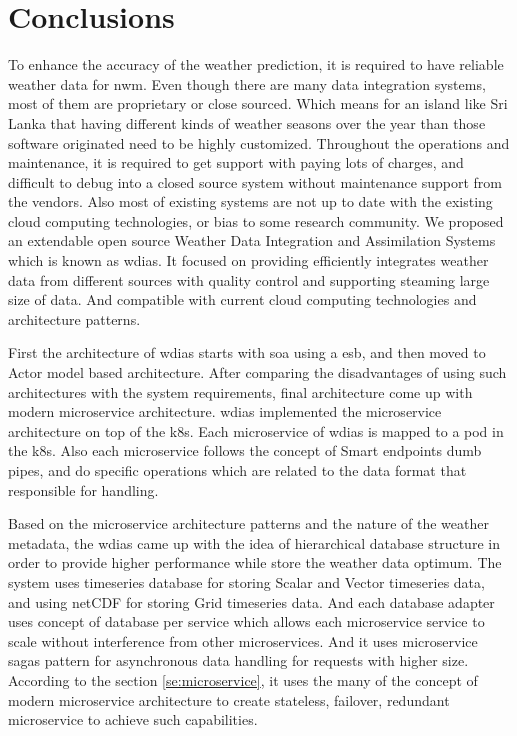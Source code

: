 \section{Conclusions}
\label{se:summary_conclusion}

To enhance the accuracy of the weather prediction, it is required to have reliable weather data for \acrshort{nwm}. Even though there are many data integration systems, most of them are proprietary or close sourced. Which means for an island like Sri Lanka that having different kinds of weather seasons over the year than those software originated need to be highly customized. Throughout the operations and maintenance, it is required to get support with paying lots of charges, and difficult to debug into a closed source system without maintenance support from the vendors. Also most of existing systems are not up to date with the existing cloud computing technologies, or bias to some research community.
We proposed an extendable open source Weather Data Integration and Assimilation Systems which is known as \acrshort{wdias}. It focused on providing efficiently integrates weather data from different sources with quality control and supporting steaming large size of data. And compatible with current cloud computing technologies and architecture patterns.

First the architecture of \acrshort{wdias} starts with \acrshort{soa} using a \acrfull{esb}, and then moved to Actor model based architecture. After comparing the disadvantages of using such architectures with the system requirements, final architecture come up with modern microservice architecture.
\acrshort{wdias} implemented the microservice architecture on top of the \acrshort{k8s}. Each microservice of \acrshort{wdias} is mapped to a pod in the \acrshort{k8s}. Also each microservice follows the concept of Smart endpoints dumb pipes, and do specific operations which are related to the data format that responsible for handling.

Based on the microservice architecture patterns and the nature of the weather metadata, the \acrshort{wdias} came up with the idea of hierarchical database structure in order to provide higher performance while store the weather data optimum. The system uses timeseries database for storing Scalar and Vector timeseries data, and using \acrshort{netCDF} for storing Grid timeseries data. And each database adapter uses concept of database per service which allows each microservice service to scale without interference from other microservices.
And it uses microservice sagas pattern for asynchronous data handling for requests with higher size. According to the section \ref{se:microservice}, it uses the many of the concept of modern microservice architecture to create stateless, failover, redundant microservice to achieve such capabilities.

